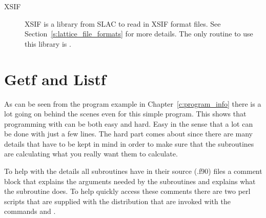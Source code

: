 \begin{description}
\item[XSIF] 
XSIF is a library from SLAC to read in XSIF format files. See 
Section~\ref{s:lattice_file_formats} for more details. The only
routine to use this library is .

\end{description}

\section{Getf and Listf}
\label{s:getf}

As can be seen from the program example in Chapter~\ref{c:program_info}
there is a lot going on behind the scenes even for this
simple program. This shows that programming with \bmad can be both easy
and hard. Easy in the sense that a lot can be done with just a few
lines. The hard part comes about since there are many details that
have to be kept in mind in order to make sure that the subroutines
are calculating what you really want them to calculate.

To help with the details all \bmad subroutines have in their source (.f90)
files a comment block that explains the arguments needed by the
subroutines and explains what the subroutine does. To help quickly
access these comments there are two perl scripts that are supplied
with the \bmad distribution that are invoked with the commands
 and .

